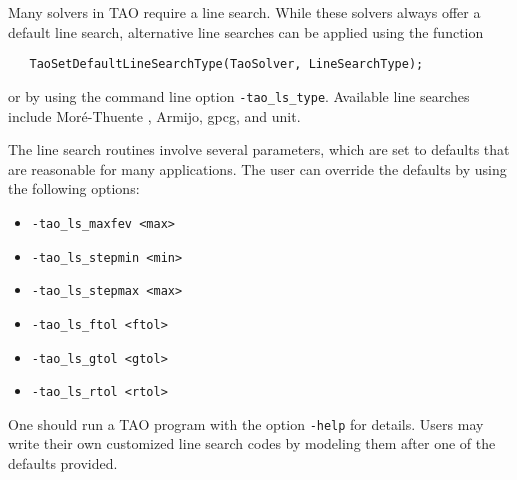 Many solvers in TAO require a line search.  While these solvers always
offer a default line search, alternative line searches can be applied
using the function
\begin{verbatim}
   TaoSetDefaultLineSearchType(TaoSolver, LineSearchType);
\end{verbatim}
or by using the command line option  {\tt -tao\_ls\_type}.  
Available line searches 
include Mor\'{e}-Thuente \cite{more:92}, Armijo, gpcg, and unit.

The line search routines involve several parameters, which are set
to defaults that are reasonable for many applications.  The user
can override the defaults by using the following options:
\begin{itemize}
\item {\tt -tao\_ls\_maxfev <max>}
\item {\tt -tao\_ls\_stepmin <min>}
\item {\tt -tao\_ls\_stepmax <max>}
\item {\tt -tao\_ls\_ftol <ftol>}
\item {\tt -tao\_ls\_gtol <gtol>}
\item {\tt -tao\_ls\_rtol <rtol>}
\end{itemize}

One should run a TAO program with the option 
{\tt -help}
for details.  Users may write their own customized line search codes
by modeling them after one of the defaults provided.

